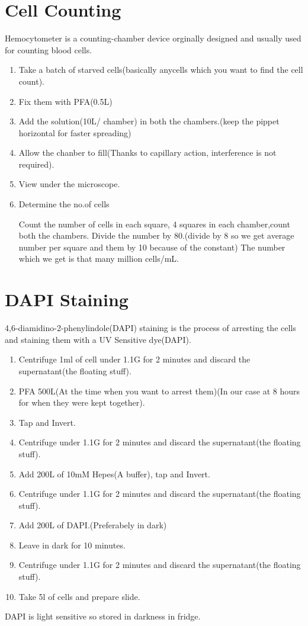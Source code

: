 \documentclass[11pt,twoside,a4paper]{article}
\begin{document}
\section{Cell Counting}
Hemocytometer is a counting-chamber device orginally designed and usually used for counting blood cells.
\begin{enumerate}
	\item Take a batch of starved cells(basically anycells which you want to find the cell count).
	\item Fix them with PFA(0.5\textmu{}L)
	\item Add the solution(10\textmu{}L/ chamber) in both the chambers.(keep the pippet horizontal for faster spreading)
	\item Allow the chanber to fill(Thanks to capillary action, interference is not required).
	\item View under the microscope.
	\item Determine the no.of cells

		Count the number of cells in each square, 4 squares in each chamber,count both the chambers.
		Divide the number by 80.(divide by 8 so we get average number per square and them by 10 because of the constant)
		The number which we get is that many million cells/mL.
\end{enumerate}

\section{DAPI Staining}
4,6-diamidino-2-phenylindole(DAPI) staining is the process of arresting the cells and staining them with a UV Sensitive dye(DAPI).
\begin{enumerate}
	\item Centrifuge 1ml of cell under 1.1G for 2 minutes and discard the supernatant(the floating stuff).
	\item PFA 500\textmu{}L(At the time when you want to arrest them)(In our case at 8 hours for when they were kept together).
	\item Tap and Invert.
	\item Centrifuge under 1.1G for 2 minutes and discard the supernatant(the floating stuff).
	\item Add 200\textmu{}L of 10mM Hepes(A buffer), tap and Invert.
	\item Centrifuge under 1.1G for 2 minutes and discard the supernatant(the floating stuff).
	\item Add 200\textmu{}L of DAPI.(Preferabely in dark)
	\item Leave in dark for 10 minutes.
	\item Centrifuge under 1.1G for 2 minutes and discard the supernatant(the floating stuff).
	\item Take 5\textmu{}l of cells and prepare slide.
\end{enumerate}
DAPI is light sensitive so stored in darkness in fridge.
\end{document}
